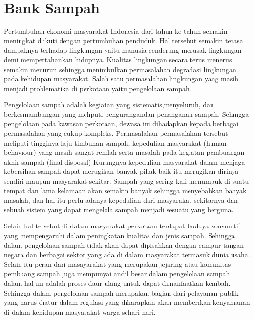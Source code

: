 \section{Bank Sampah}
Pertumbuhan ekonomi masyarakat Indonesia dari tahun ke tahun semakin meningkat diikuti dengan pertumbuhan penduduk. Hal tersebut semakin terasa dampaknya terhadap lingkungan yaitu manusia cenderung merusak lingkungan demi mempertahankan hidupnya. Kualitas lingkungan secara terus menerus semakin menurun sehingga menimbulkan permasalahan degradasi lingkungan pada kehidupan masyarakat. Salah satu permasalahan lingkungan yang masih menjadi problematika di perkotaan yaitu pengelolaan sampah.

Pengelolaan sampah adalah kegiatan yang sistematis,menyeluruh, dan berkesinambungan yang meliputi pengurangandan penanganan sampah. Sehingga pengelolaan pada kawasan perkotaan, dewasa ini dihadapkan kepada berbagai permasalahan yang cukup kompleks. Permasalahan-permasalahan tersebut meliputi tingginya laju timbunan sampah, kepedulian masyarakat (human behaviour) yang masih sangat rendah serta masalah pada kegiatan pembuangan akhir sampah (final disposal) 
Kurangnya kepedulian masyarakat dalam menjaga kebersihan sampah dapat merugikan banyak pihak baik itu merugikan dirinya sendiri maupun masyarakat sekitar. Sampah yang sering kali menumpuk di suatu tempat dan lama kelamaan akan semakin banyak  sehingga menyebabkan banyak masalah, dan hal itu perlu adanya kepedulian dari masyarakat sekitarnya dan sebuah sistem yang dapat mengelola sampah menjadi sesuatu yang berguna.

Selain hal tersebut di dalam masyarakat perkotaan terdapat budaya konsumtif yang mempengaruhi dalam peningkatan kualitas dan jenis sampah. Sehingga dalam pengelolaan sampah tidak akan dapat dipisahkan dengan campur tangan negara dan berbagai sektor yang ada di dalam masyarakat termasuk dunia usaha. Selain itu peran dari masayarakat yang merupakan jejaring atau komunitas pembuang sampah juga mempunyai andil besar dalam pengelolaan sampah dalam hal ini adalah proses daur ulang untuk dapat dimanfaatkan kembali. Sehingga dalam pengelolaan sampah merupakan bagian dari pelayanan publik yang harus diatur dalam regulasi yang diharapkan akan memberikan kenyamanan di dalam kehidupan masyarakat warga sehari-hari.

